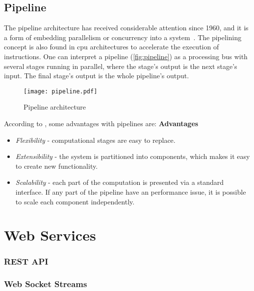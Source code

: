 \subsection{Pipeline}
The pipeline architecture has received considerable attention since 1960, and it is a form of embedding parallelism or concurrency into a system~\cite{ramamoorthy1977pipeline}. The pipelining concept is also found in \ac{cpu} architectures to accelerate the execution of instructions. One can interpret a pipeline (\autoref{fig:pipeline}) as a processing bus with several stages running in parallel, where the stage's output is the next stage's input. The final stage's output is the whole pipeline's output.

\begin{figure}
    \centering
    \texttt{[image: pipeline.pdf]}
    \caption{Pipeline architecture}
    \label{fig:pipeline}
\end{figure}

According to \cite{ml_pipeline_1}, some advantages with pipelines are:
\textbf{Advantages}
\begin{itemize}
    \item \emph{Flexibility} - computational stages are easy to replace. 
    \item \emph{Extensibility} - the system is partitioned into components, which makes it easy to create new functionality.
    \item \emph{Scalability} - each part of the computation is presented via a standard interface. If any part of the pipeline have an performance issue, it is possible to scale each component independently.
\end{itemize}

\section{Web Services}
\subsubsection{REST API}
\subsubsection{Web Socket Streams}
\fi

